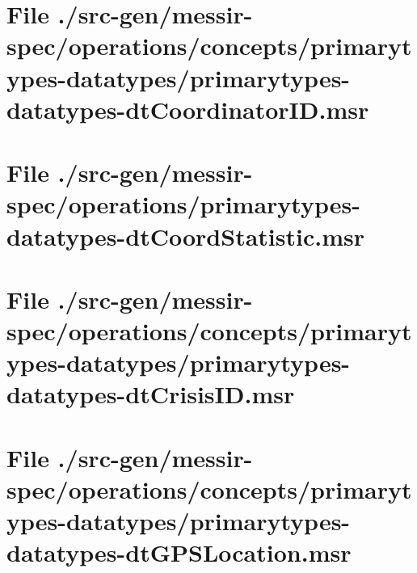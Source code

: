 \section[File /src-gen/messir-spec.../primarytypes-datatypes-dtCoordinatorID.msr]{File ./src-gen/messir-spec/operations/concepts/primarytypes-datatypes/primarytypes-datatypes-dtCoordinatorID.msr}
\scriptsize

\normalsize
	
\section[File /src-gen/messir-spec/operations/primarytypes-datatypes-dtCoordStatistic.msr]{File ./src-gen/messir-spec/operations/primarytypes-datatypes-dtCoordStatistic.msr}
\scriptsize

\normalsize
	
\section[File /src-gen/messir-spec/operations.../primarytypes-datatypes-dtCrisisID.msr]{File ./src-gen/messir-spec/operations/concepts/primarytypes-datatypes/primarytypes-datatypes-dtCrisisID.msr}
\scriptsize

\normalsize
	
\section[File /src-gen/messir-spec.../primarytypes-datatypes-dtGPSLocation.msr]{File ./src-gen/messir-spec/operations/concepts/primarytypes-datatypes/primarytypes-datatypes-dtGPSLocation.msr}
\scriptsize

\normalsize
	
